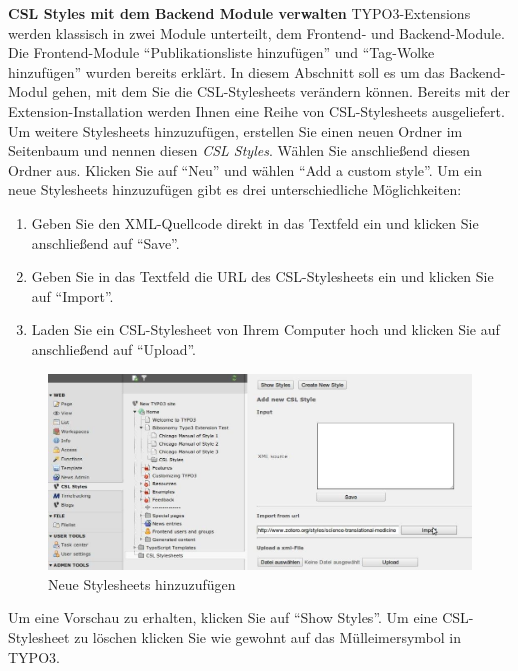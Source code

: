 \textbf{CSL Styles mit dem Backend Module verwalten}\newline
\newline
TYPO3-Extensions werden klassisch in zwei Module unterteilt, dem Frontend- und Backend-Module. Die Frontend-Module \enquote{Publikationsliste hinzufügen} und \enquote{Tag-Wolke hinzufügen} wurden bereits erklärt. In diesem Abschnitt soll es um das Backend-Modul gehen, mit dem Sie die CSL-Stylesheets verändern können.\newline \newline
Bereits mit der Extension-Installation werden Ihnen eine Reihe von CSL-Stylesheets ausgeliefert. Um weitere Stylesheets hinzuzufügen, erstellen Sie einen neuen Ordner im Seitenbaum und nennen diesen \textit{CSL Styles}. Wählen Sie anschließend diesen Ordner aus. Klicken Sie auf \enquote{Neu} und wählen \enquote{Add a custom style}.\newline \newline
Um ein neue Stylesheets hinzuzufügen gibt es drei unterschiedliche Möglichkeiten:
\begin{enumerate}
\item Geben Sie den XML-Quellcode direkt in das Textfeld ein und klicken Sie anschließend auf \enquote{Save}.
\item Geben Sie in das Textfeld die URL des CSL-Stylesheets ein und klicken Sie auf \enquote{Import}.
\item Laden Sie ein CSL-Stylesheet von Ihrem Computer hoch und klicken Sie auf anschließend auf \enquote{Upload}. 
\end{enumerate}
\begin{figure}[ht]
 \centering
 \includegraphics[scale=0.3]{puma-102}
 \caption{Neue Stylesheets hinzuzufügen}
 \label{figure1}
\end{figure}
Um eine Vorschau zu erhalten, klicken Sie auf \enquote{Show Styles}.\newline
Um eine CSL-Stylesheet zu löschen klicken Sie wie gewohnt auf das Mülleimersymbol in TYPO3. 

